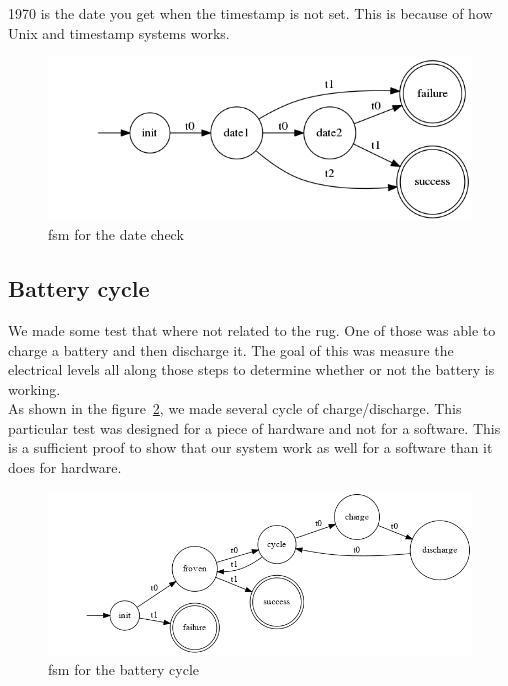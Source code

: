 \documentclass[12pt]{article}
\theoremstyle{definition}
\theoremstyle{definition}
\theoremstyle{remark}
\begin{document}
1970 is the date you get when the timestamp is not set. This is because of how Unix and timestamp systems works.

\begin{figure}
    \centering
    \includegraphics[scale=0.6]{graph/DateCheck}
    \caption{\gls{fsm} for the date check}
    \label{datecheck}
\end{figure}


\subsection{Battery cycle}

We made some test that where not related to the \gls{rug}. One of those was able to charge a battery and then discharge it. The goal of this was measure the electrical levels all along those steps to determine whether or not the battery is working.\\

As shown in the figure~\ref{battcycle2}, we made several cycle of charge/discharge. This particular test was designed for a piece of hardware and not for a software. This is a sufficient proof to show that our system work as well for a software than it does for hardware.

\begin{figure}
    \centering
    \includegraphics[scale=0.4]{graph/BatteryCycle.png}
    \caption{\gls{fsm} for the battery cycle}
    \label{battcycle2}
\end{figure}

\clearpage
{}

{}

\clearpage
\printglossaries

%
\end{document}
